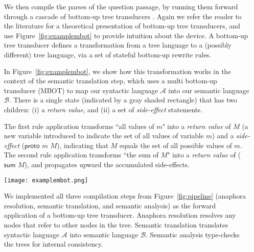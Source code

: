 \documentclass[11pt,letterpaper]{article}
\begin{document}
We then compile the parses of the question passage, by running them forward through a cascade of bottom-up tree transducers \cite{engelfriet1975bottom}. Again we refer the reader to the literature \cite{Maletti2011HowTT,Maletti2014ThePO} for a theoretical presentation of bottom-up tree transducers, and use Figure~\ref{fig:examplembot} to provide intuition about the device. A bottom-up tree transducer defines a transformation from a tree language to a (possibly different) tree language, via a set of stateful bottom-up rewrite rules. 

In Figure~\ref{fig:examplembot}, we show how this transformation works in the context of the semantic translation step, which uses a multi bottom-up transducer (MBOT) to map our syntactic language $\mathcal{A}$ into our semantic language $\mathcal{B}$. There is a single state (indicated by a gray shaded rectangle) that has two children: (i) a \emph{return value}, and (ii) a set of \emph{side-effect} statements. 

The first rule application transforms ``all values of $m$" into a \emph{return value} of $M$ (a new variable introduced to indicate the set of all values of variable $m$) and a \emph{side-effect} ($\mathsf{proto}$ $m$ $M$), indicating that $M$ equals the set of all possible values of $m$. The second rule application transforms ``the sum of $M$" into a \emph{return value} of ($\mathsf{sum}$ $M$), and propagates upward the accumulated side-effects.
 
\begin{figure*}[tb]
\centering
\mbox{\texttt{[image: examplembot.png]}}
\caption{\label{fig:examplembot} Example semantic translation using an MBOT.}
\end{figure*}

We implemented all three compilation steps from Figure~\ref{fig:pipeline} (anaphora resolution, semantic translation, and semantic analysis) as the forward application of a bottom-up tree transducer. Anaphora resolution resolves any nodes that refer to other nodes in the tree. Semantic translation translates syntactic language $\mathcal{A}$ into semantic language $\mathcal{B}$. Semantic analysis type-checks the trees for internal consistency.


\end{document}
